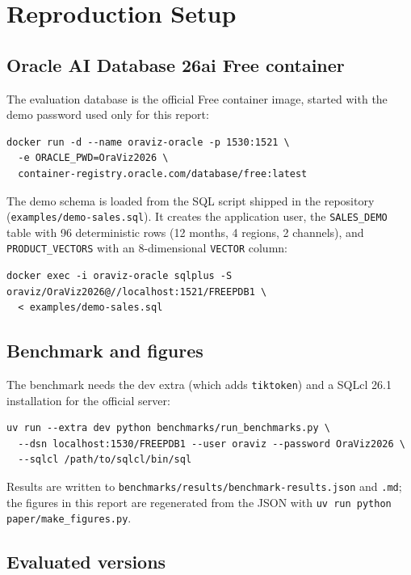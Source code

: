 \section{Reproduction Setup}\label{app:setup}

\subsection{Oracle AI Database 26ai Free container}

The evaluation database is the official Free container image, started with the demo password used only for this report:

\begin{lstlisting}[style=codestyle]
docker run -d --name oraviz-oracle -p 1530:1521 \
  -e ORACLE_PWD=OraViz2026 \
  container-registry.oracle.com/database/free:latest
\end{lstlisting}

The demo schema is loaded from the SQL script shipped in the repository (\texttt{examples/demo-sales.sql}). It creates the application user, the \texttt{SALES\_DEMO} table with 96 deterministic rows (12 months, 4 regions, 2 channels), and \texttt{PRODUCT\_VECTORS} with an 8-dimensional \texttt{VECTOR} column:

\begin{lstlisting}[style=codestyle]
docker exec -i oraviz-oracle sqlplus -S oraviz/OraViz2026@//localhost:1521/FREEPDB1 \
  < examples/demo-sales.sql
\end{lstlisting}

\subsection{Benchmark and figures}

The benchmark needs the dev extra (which adds \texttt{tiktoken}) and a SQLcl 26.1 installation for the official server:

\begin{lstlisting}[style=codestyle]
uv run --extra dev python benchmarks/run_benchmarks.py \
  --dsn localhost:1530/FREEPDB1 --user oraviz --password OraViz2026 \
  --sqlcl /path/to/sqlcl/bin/sql
\end{lstlisting}

Results are written to \texttt{benchmarks/results/benchmark-results.json} and \texttt{.md}; the figures in this report are regenerated from the JSON with \texttt{uv run python paper/make\_figures.py}.

\subsection{Evaluated versions}

